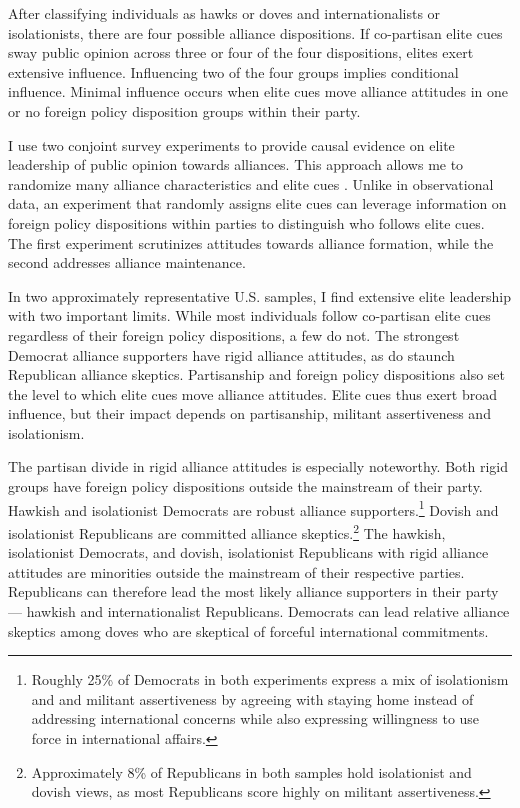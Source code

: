 \documentclass[12pt]{article}
\begin{document}
After classifying individuals as hawks or doves and internationalists or isolationists, there are four possible alliance dispositions. 
If co-partisan elite cues sway public opinion across three or four of the four dispositions, elites exert extensive influence. 
Influencing two of the four groups implies conditional influence. 
Minimal influence occurs when elite cues move alliance attitudes in one or no foreign policy disposition groups within their party.


I use two conjoint survey experiments to provide causal evidence on elite leadership of public opinion towards alliances.
This approach allows me to randomize many alliance characteristics and elite cues \citep{Hainmuelleretal2014}.
Unlike in observational data, an experiment that randomly assigns elite cues can leverage information on foreign policy dispositions within parties to distinguish who follows elite cues. 
The first experiment scrutinizes attitudes towards alliance formation, while the second addresses alliance maintenance. 


In two approximately representative U.S. samples, I find extensive elite leadership with two important limits.
While most individuals follow co-partisan elite cues regardless of their foreign policy dispositions, a few do not.
The strongest Democrat alliance supporters have rigid alliance attitudes, as do staunch Republican alliance skeptics. 
Partisanship and foreign policy dispositions also set the level to which elite cues move alliance attitudes.
Elite cues thus exert broad influence, but their impact depends on partisanship, militant assertiveness and isolationism.


The partisan divide in rigid alliance attitudes is especially noteworthy.
Both rigid groups have foreign policy dispositions outside the mainstream of their party. 
Hawkish and isolationist Democrats are robust alliance supporters.\footnote{Roughly 25\% of Democrats in both experiments express a mix of isolationism and and militant assertiveness by agreeing with staying home instead of addressing international concerns while also expressing willingness to use force in international affairs.}
Dovish and isolationist Republicans are committed alliance skeptics.\footnote{Approximately 8\% of Republicans in both samples hold isolationist and dovish views, as most Republicans score highly on militant assertiveness.} 
The hawkish, isolationist Democrats, and dovish, isolationist Republicans with rigid alliance attitudes are minorities outside the mainstream of their respective parties. 
Republicans can therefore lead the most likely alliance supporters in their party--- hawkish and internationalist Republicans.
Democrats can lead relative alliance skeptics among doves who are skeptical of forceful international commitments.
\end{document}
